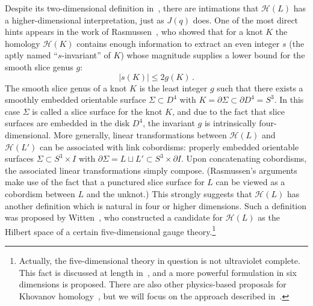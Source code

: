 \documentclass[11pt]{article}
\numberwithin{equation}{section}
\begin{document}
Despite its two-dimensional definition in~\cite{khovanov2000}, there are intimations that $\mathcal{H}(L)$ has a higher-dimensional interpretation, just as $J(q)$ does.
One of the most direct hints appears in the work of Rasmussen~\cite{rasmussen2010khovanov}, who showed that for a knot $K$ the homology $\mathcal{H}(K)$ contains enough information to extract an even integer $s$ (the aptly named ``$s$-invariant'' of $K$) whose magnitude supplies a lower bound for the smooth slice genus $g$:
\begin{equation}
    |s(K)| \leq 2g(K) \,.
    \label{eq:s_and_g}
\end{equation}
The smooth slice genus of a knot $K$ is the least integer $g$ such that there exists a smoothly embedded orientable surface $\Sigma \subset D^4$ with $K = \partial \Sigma \subset \partial D^4 = S^3$.
In this case $\Sigma$ is called a slice surface for the knot $K$, and due to the fact that slice surfaces are embedded in the disk $D^4$, the invariant $g$ is intrinsically four-dimensional.
More generally, linear transformations between $\mathcal{H}(L)$ and $\mathcal{H}(L')$ can be associated with link cobordisms: properly embedded orientable surfaces $\Sigma \subset S^3 \times I$ with $\partial \Sigma = L \sqcup L' \subset S^3 \times \partial I$.
Upon concatenating cobordisms, the associated linear transformations simply compose.
(Rasmussen's arguments make use of the fact that a punctured slice surface for $L$ can be viewed as a  cobordism between $L$ and the unknot.)
This strongly suggests that $\mathcal{H}(L)$ has another definition which is natural in four or higher dimensions.
Such a definition was proposed by Witten~\cite{Witten:2011zz}, who constructed a candidate for $\mathcal{H}(L)$ as the Hilbert space of a certain five-dimensional gauge theory.\footnote{
Actually, the five-dimensional theory in question is not ultraviolet complete.
This fact is discussed at length in~\cite{Witten:2011zz}, and a more powerful formulation in six dimensions is proposed.  There are also other physics-based proposals for Khovanov homology~\cite{Gukov:2003na,Aganagic:2020olg,Aganagic:2021ubp}, but we will focus on the approach described in~\cite{Witten:2011zz}. }
\end{document}
